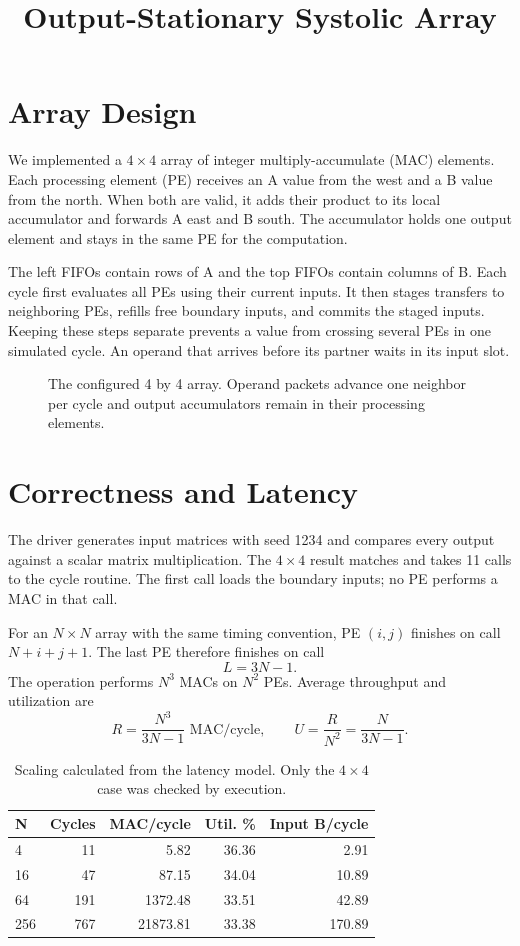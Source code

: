 \documentclass{article}
\title{Output-Stationary Systolic Array}
\author{}
\date{}
\begin{document}
\maketitle


\section{Array Design}
We implemented a $4\times4$ array of integer multiply-accumulate (MAC) elements. Each processing element (PE) receives an A value from the west and a B value from the north. When both are valid, it adds their product to its local accumulator and forwards A east and B south. The accumulator holds one output element and stays in the same PE for the computation.

The left FIFOs contain rows of A and the top FIFOs contain columns of B. Each cycle first evaluates all PEs using their current inputs. It then stages transfers to neighboring PEs, refills free boundary inputs, and commits the staged inputs. Keeping these steps separate prevents a value from crossing several PEs in one simulated cycle. An operand that arrives before its partner waits in its input slot.


\begin{figure}[H]\centering

\caption{The configured 4 by 4 array. Operand packets advance one neighbor per cycle and output accumulators remain in their processing elements.}\label{fig:architecture}
\end{figure}

\section{Correctness and Latency}
The driver generates input matrices with seed 1234 and compares every output against a scalar matrix multiplication. The $4\times4$ result matches and takes 11 calls to the cycle routine. The first call loads the boundary inputs; no PE performs a MAC in that call.

For an $N\times N$ array with the same timing convention, PE $(i,j)$ finishes on call $N+i+j+1$. The last PE therefore finishes on call
\[
L=3N-1.
\]
The operation performs $N^3$ MACs on $N^2$ PEs. Average throughput and utilization are
\[
R=\frac{N^3}{3N-1}\text{ MAC/cycle},\qquad
U=\frac{R}{N^2}=\frac{N}{3N-1}.
\]
\begin{table}[H]\centering\small
\begin{tabular}{lrrrr}
\toprule
N & Cycles & MAC/cycle & Util. \% & Input B/cycle \\
\midrule
4 & 11 & 5.82 & 36.36 & 2.91 \\
16 & 47 & 87.15 & 34.04 & 10.89 \\
64 & 191 & 1372.48 & 33.51 & 42.89 \\
256 & 767 & 21873.81 & 33.38 & 170.89 \\
\bottomrule\end{tabular}\caption{Scaling calculated from the latency model. Only the $4\times4$ case was checked by execution.}\end{table}
\end{document}
